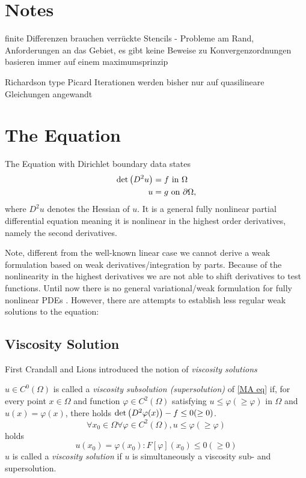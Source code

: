 \section{Notes}
finite Differenzen brauchen verrückte Stencils - Probleme am Rand, Anforderungen an das Gebiet, es gibt keine Beweise zu Konvergenzordnungen
basieren immer auf einem maximumsprinzip

Richardson type Picard Iterationen werden bisher nur auf quasilineare Gleichungen angewandt


\section{The \MA Equation}

The \MA Equation with Dirichlet boundary data states
\begin{align}
	 \det{\left(D^2 u\right)} &= f \textnormal{ in } \Omega \label{MA eq}\\
	 u & = g \textnormal{ on } \partial \Omega,
\end{align}
where $D^2 u$ denotes the Hessian of $u$.
It is a general fully nonlinear partial differential equation meaning it is nonlinear in the highest order derivatives, namely the second derivatives.

Note, different from the well-known linear case we cannot derive a weak formulation based on weak derivatives/integration by parts. Because of the nonlinearity in the highest derivatives we are not able to shift derivatives to test functions. Until now there is no general variational/weak formulation for fully nonlinear PDEs \cite{FGN2013}.
However, there are attempts to establish less regular weak solutions to the \MA equation:

\subsection{Viscosity Solution}
First Crandall and Lions \cite{58} introduced the notion of \emph{viscosity solutions}

\begin{definition}
	$u \in C^0(\Omega)$ is called a \emph{viscosity subsolution (supersolution)} of \eqref{MA eq} if, for every point $x \in \Omega$ and function $\varphi \in C^2(\Omega)$ satisfying $u \leq \varphi (\geq \varphi)$ in $\Omega$ and $u(x) = \varphi(x)$, there holds $\det{\left(D^2 \varphi(x)\right)} - f \leq 0 (\geq 0)$. 
	\[
	\forall x_0 \in \Omega \forall \varphi \in C^2(\Omega), u \leq \varphi (\geq \varphi)
	\] holds
	\[
	u(x_0) = \varphi(x_0) : F[\varphi](x_0) \leq 0 (\geq 0)
	\]
	$u$ is called a \emph{viscosity solution} if $u$ is simultaneously a viscosity sub- and supersolution.
\end{definition}

